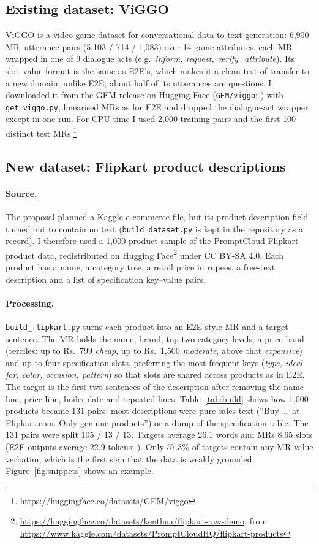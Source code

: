 \documentclass[11pt]{article}
\begin{document}
\subsection{Existing dataset: ViGGO}
ViGGO \citep{juraska-etal-2019-viggo} is a video-game dataset for conversational data-to-text generation: 6,900 MR--utterance pairs (5,103 / 714 / 1,083) over 14 game attributes, each MR wrapped in one of 9 dialogue acts (e.g.\ \textit{inform, request, verify\_attribute}). Its slot--value format is the same as E2E's, which makes it a clean test of transfer to a new domain; unlike E2E, about half of its utterances are questions. I downloaded it from the GEM release on Hugging Face (\texttt{GEM/viggo}; \citealp{gehrmann-etal-2021-gem}) with \texttt{get\_viggo.py}, linearised MRs as for E2E and dropped the dialogue-act wrapper except in one run. For CPU time I used 2,000 training pairs and the first 100 distinct test MRs.\footnote{\url{https://huggingface.co/datasets/GEM/viggo}}

\subsection{New dataset: Flipkart product descriptions}
\paragraph{Source.} The proposal planned a Kaggle e-commerce file, but its product-description field turned out to contain no text (\texttt{build\_dataset.py} is kept in the repository as a record). I therefore used a 1,000-product sample of the PromptCloud Flipkart product data, redistributed on Hugging Face\footnote{\url{https://huggingface.co/datasets/kenthua/flipkart-raw-demo}, from \url{https://www.kaggle.com/datasets/PromptCloudHQ/flipkart-products}} under CC BY-SA 4.0. Each product has a name, a category tree, a retail price in rupees, a free-text description and a list of specification key--value pairs.

\paragraph{Processing.} \texttt{build\_flipkart.py} turns each product into an E2E-style MR and a target sentence. The MR holds the name, brand, top two category levels, a price band (terciles: up to Rs.~799 \emph{cheap}, up to Rs.~1,500 \emph{moderate}, above that \emph{expensive}) and up to four specification slots, preferring the most frequent keys (\textit{type, ideal for, color, occasion, pattern}) so that slots are shared across products as in E2E. The target is the first two sentences of the description after removing the name line, price line, boilerplate and repeated lines. Table~\ref{tab:build} shows how 1,000 products became 131 pairs: most descriptions were pure sales text (``Buy \dots\ at Flipkart.com. Only genuine products'') or a dump of the specification table. The 131 pairs were split 105 / 13 / 13. Targets average 26.1 words and MRs 8.65 slots (E2E outputs average 22.9 tokens; \citealp{li-liang-2021-prefix}). Only 57.3\% of targets contain any MR value verbatim, which is the first sign that the data is weakly grounded. Figure~\ref{fig:snippets} shows an example.
\end{document}
